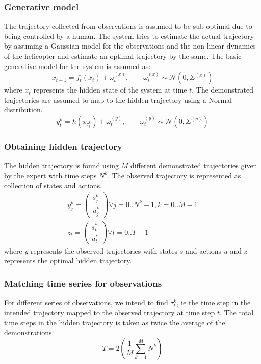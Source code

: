 \documentclass[hidelinks,BTech]{iitmdiss}
\begin{document}
\subsubsection{Generative model}
The trajectory collected from observations is assumed to be sub-optimal due to being controlled by a human. The system tries to estimate the actual trajectory by assuming a Gaussian model for the observations and the non-linear dynamics of the helicopter and estimate an optimal trajectory by the same. The basic generative model for the system is assumed as:
\begin{equation}
  x_{t+1} = f_{t} (x_{t}) + {\omega}_{t}^{(x)}, \qquad \omega_t^{(x)} \sim \mathcal{N} (0, \Sigma^{(x)})
\end{equation}
where $x_t$ represents the hidden state of the system at time $t$. The demonstrated trajectories are assumed to map to the hidden trajectory using a Normal distribution.
\begin{equation}
  y_{t}^{k} = h(x_{\tau_t^k}) + {\omega}_{t}^{(y)}, \qquad \omega_t^{(y)} \sim \mathcal{N} (0, \Sigma^{(y)})
\end{equation}

\subsubsection{Obtaining hidden trajectory}
The hidden trajectory is found using $M$ different demonstrated trajectories given by the expert with time steps $N^k$. The observed trajectory is represented as collection of states and actions. 
\begin{equation}
	\begin{array}{c}
	y_j^k = \left(\begin{array}{c}
		s_j^k\\
		u_j^k
	\end{array}\right) \forall j=0..N^k-1, k=0..M-1\\
	z_t = \left(\begin{array}{c}
		s^*_t\\
		u^*_t
	\end{array}\right) \forall t=0..T-1
	\end{array}
\end{equation}
where $y$ represents the observed trajectories with states $s$ and actions $u$ and $z$ represents the optimal hidden trajectory.


\subsubsection*{Matching time series for observations}
For different series of observations, we intend to find $\tau_t^k$, ie  the time step in the intended trajectory mapped to the observed trajectory at time step $t$. The total time steps in the hidden trajectory is taken as twice the average of the demonstrations:
\begin{equation}
  T = 2 \left( \frac{1}{M} \sum_{k=1}^{M} N^k \right)
\end{equation}
\end{document}
